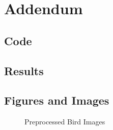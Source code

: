 \documentclass{article}
\begin{document}
    \section*{Addendum}
    \subsection*{Code}
    \subsection*{Results}
    \subsection*{Figures and Images}
        \begin{figure}[h!]
        \centering
        \caption{Preprocessed Bird Images}
        \label{Birds}
    \end{figure}
   
        
        
\end{document}
